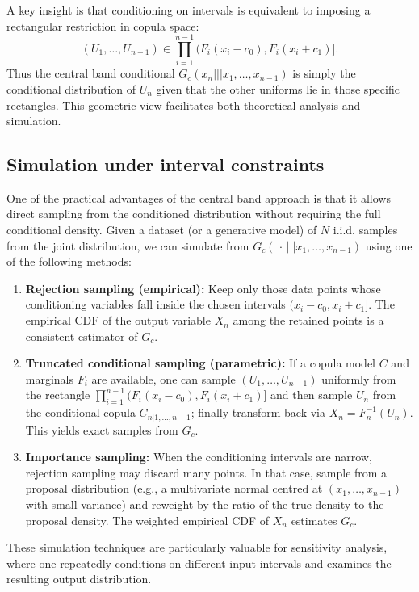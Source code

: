 A key insight is that conditioning on intervals is equivalent to imposing a rectangular restriction in copula space:
\[
(U_1,\dots,U_{n-1}) \in \prod_{i=1}^{n-1} \bigl( F_i(x_i-c_0), F_i(x_i+c_1) \bigr].
\]
Thus the central band conditional $G_c(x_n ||| x_1,\dots,x_{n-1})$ is simply the conditional distribution of $U_n$ given that the other uniforms lie in those specific rectangles. This geometric view facilitates both theoretical analysis and simulation.

\subsection*{Simulation under interval constraints}

One of the practical advantages of the central band approach is that it allows direct sampling from the conditioned distribution without requiring the full conditional density. Given a dataset (or a generative model) of $N$ i.i.d. samples from the joint distribution, we can simulate from $G_c(\,\cdot\,||| x_1,\dots,x_{n-1})$ using one of the following methods:

\begin{enumerate}
\item \textbf{Rejection sampling (empirical):}
   Keep only those data points whose conditioning variables fall inside the chosen intervals $(x_i-c_0,x_i+c_1]$. The empirical CDF of the output variable $X_n$ among the retained points is a consistent estimator of $G_c$.

\item \textbf{Truncated conditional sampling (parametric):}
   If a copula model $C$ and marginals $F_i$ are available, one can sample $(U_1,\dots,U_{n-1})$ uniformly from the rectangle
   $\prod_{i=1}^{n-1} (F_i(x_i-c_0), F_i(x_i+c_1)]$ and then sample $U_n$ from the conditional copula $C_{n|1,\dots,n-1}$; finally transform back via $X_n = F_n^{-1}(U_n)$. This yields exact samples from $G_c$.

\item \textbf{Importance sampling:}
   When the conditioning intervals are narrow, rejection sampling may discard many points. In that case, sample from a proposal distribution (e.g., a multivariate normal centred at $(x_1,\dots,x_{n-1})$ with small variance) and reweight by the ratio of the true density to the proposal density. The weighted empirical CDF of $X_n$ estimates $G_c$.
\end{enumerate}

These simulation techniques are particularly valuable for sensitivity analysis, where one repeatedly conditions on different input intervals and examines the resulting output distribution.

